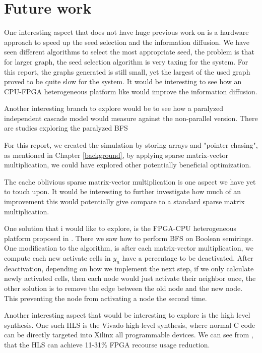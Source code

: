 \chapter{Future work}
One interesting aspect that does not have huge previous work on is a hardware approach to speed up the seed selection and the information diffusion. We have seen different algorithms to select the most appropriate seed, the problem is that for larger graph, the seed selection algorithm is very taxing for the system. For this report, the graphs generated is still small, yet the largest of the used graph proved to be quite slow for the system. It would be interesting to see how an CPU-FPGA heterogeneous platform like \cite{HybridBFS2015} would improve the information diffusion. 

Another interesting branch to explore would be to see how a paralyzed independent cascade model would measure against the non-parallel version. There are studies exploring the paralyzed BFS \cite{ParallelBFS2011}

For this report, we created the simulation by storing arrays and "pointer chasing", as mentioned in Chapter \ref{background}, by applying sparse matrix-vector multiplication, we could have explored other potentially beneficial optimization. 

The cache oblivious sparse matrix-vector multiplication is one aspect we have yet to touch upon. It would be interesting to further investigate how much of an improvement this would potentially give compare to a standard sparse matrix multiplication.


One solution that i would like to explore, is the FPGA-CPU heterogeneous platform proposed in \cite{HybridBFS2015}. There we saw how to perform BFS on Boolean semirings. One modification to the algorithm, is after each matrix-vector multiplication, we compute each new activate cells in $y_n$ have a percentage to be deactivated. After deactivation, depending on how we implement the next step, if we only calculate newly activated cells, then each node would just activate their neighbor once, the other solution is to remove the edge between the old node and the new node. This preventing the node from activating a node the second time.

Another interesting aspect that would be interesting to explore is the high level synthesis. One such HLS is the Vivado high-level synthesis, where normal C code can be directly targeted into Xilinx all programmable devices. We can see from \cite{HLS2011}, that the HLS can achieve 11-31\% FPGA recourse usage reduction. 